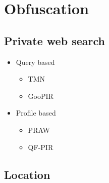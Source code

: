 \documentclass[a4paper,12pt,dutch]{article}
\begin{document}
\section{Obfuscation}
\subsection{Private web search}
\begin{itemize}
	\item Query based
	\begin{itemize}
		\item TMN
		\item GooPIR
	\end{itemize}
	\item Profile based
	\begin{itemize}
		\item PRAW
		\item QF-PIR
	\end{itemize}
\end{itemize}
\subsection{Location}
\end{document}

